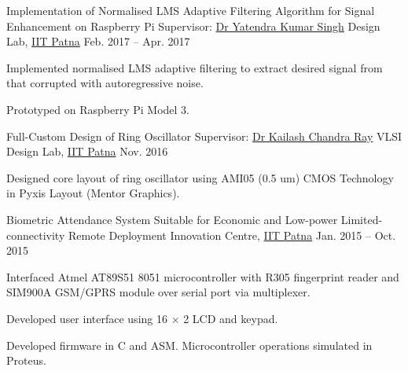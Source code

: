 
\begin{cvprojects}

\cvproject
	{Implementation of Normalised LMS Adaptive Filtering Algorithm for Signal Enhancement on Raspberry Pi} %
	{Supervisor: \href{https://www.iitp.ac.in/index.php/departments/engineering/electrical-engineering/people/faculty/dr-yatendra-kumar-singh.html}{Dr Yatendra Kumar Singh}} %
	{Design Lab, \href{https://www.iitp.ac.in}{IIT Patna}} %
	{Feb. 2017 -- Apr. 2017} %
	{\begin{cvitems} %
		\item {Implemented normalised LMS adaptive filtering to extract desired signal from that corrupted with autoregressive noise.}
		\item {Prototyped on Raspberry Pi Model 3.}
	\end{cvitems}}

\cvproject
	{Full-Custom Design of Ring Oscillator} %
	{Supervisor: \href{https://www.iitp.ac.in/index.php/departments/engineering/electrical-engineering/people/faculty/dr-kailash-chandra-ray.html}{Dr Kailash Chandra Ray}} %
	{VLSI Design Lab, \href{https://www.iitp.ac.in}{IIT Patna}} %
	{Nov. 2016} %
	{\begin{cvitems} %
		\item {Designed core layout of ring oscillator using AMI05 (0.5 um) CMOS Technology in Pyxis Layout (Mentor Graphics).}
	\end{cvitems}}

\cvproject
	{Biometric Attendance System Suitable for Economic and Low-power Limited-connectivity Remote Deployment} %
	{} %
	{Innovation Centre, \href{https://www.iitp.ac.in}{IIT Patna}} %
	{Jan. 2015 -- Oct. 2015} %
	{\begin{cvitems} %
		\item {Interfaced Atmel AT89S51 8051 microcontroller with R305 fingerprint reader and SIM900A GSM/GPRS module over serial port via multiplexer.}
		\item {Developed user interface using 16 $\times$ 2 LCD and keypad.}
		\item {Developed firmware in C and ASM. Microcontroller operations simulated in Proteus.}
	\end{cvitems}}

\end{cvprojects}
